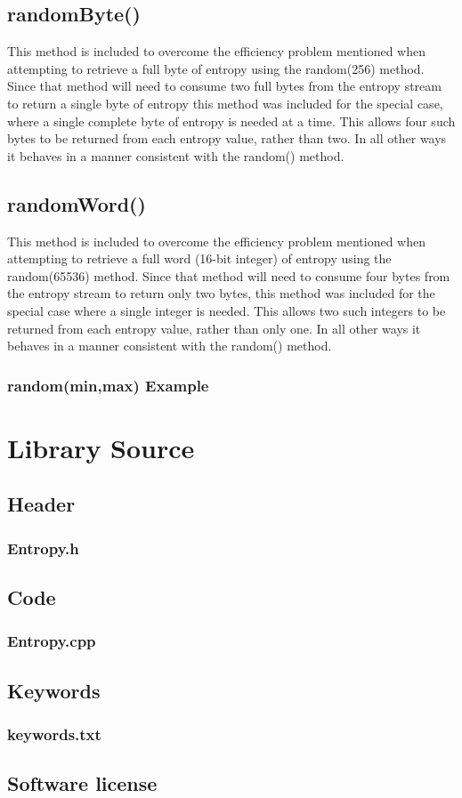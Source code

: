 \documentclass[10pt]{report}
\newcommand{\code}[2]{
 \hrulefill
 \subsection*{#1}
 
 \vspace{2em}
}
\begin{document}
\section{randomByte()} 

This method is included to overcome the efficiency problem mentioned when attempting to retrieve a full byte of entropy using the random(256) method.  Since that method will need to consume 
two full bytes from the entropy stream to return a single byte of entropy this method was included for the special case, where a single complete byte of entropy is needed at a time.  This allows 
four such bytes to be returned from each entropy value, rather than two.  In all other ways it behaves in a manner consistent with the random() method.

\section{randomWord()}

This method is included to overcome the efficiency problem mentioned when attempting to retrieve a full word (16-bit integer) of entropy using the random(65536) method.  Since that method will
need to consume four bytes from the entropy stream to return only two bytes, this method was included for the special case where a single integer is needed.  This allows two such integers to be 
returned from each entropy value, rather than only one.  In all other ways it behaves in a manner consistent with the random() method.

\code{random(min,max) Example}{random_minmax_example.ino}

\chapter{Library Source}

\section{Header}

\code{Entropy.h}{../Entropy.h}

\section{Code}

\code{Entropy.cpp}{../Entropy.cpp}

\section{Keywords}

\code{keywords.txt}{../keywords.txt}

\section{Software license}

\code{}{../gpl.txt}




\end{document}
